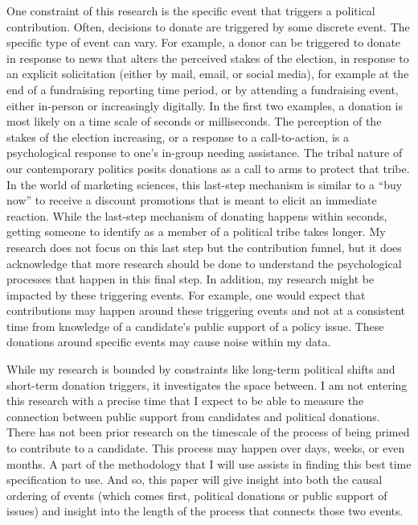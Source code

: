\documentclass[12pt,]{article}
\begin{document}
One constraint of this research is the specific event that triggers a
political contribution. Often, decisions to donate are triggered by some
discrete event. The specific type of event can vary. For example, a
donor can be triggered to donate in response to news that alters the
perceived stakes of the election, in response to an explicit
solicitation (either by mail, email, or social media), for example at
the end of a fundraising reporting time period, or by attending a
fundraising event, either in-person or increasingly digitally. In the
first two examples, a donation is most likely on a time scale of seconds
or milliseconds. The perception of the stakes of the election
increasing, or a response to a call-to-action, is a psychological
response to one's in-group needing assistance. The tribal nature of our
contemporary politics posits donations as a call to arms to protect that
tribe. In the world of marketing sciences, this last-step mechanism is
similar to a ``buy now'' to receive a discount promotions that is meant
to elicit an immediate reaction. While the last-step mechanism of
donating happens within seconds, getting someone to identify as a member
of a political tribe takes longer. My research does not focus on this
last step but the contribution funnel, but it does acknowledge that more
research should be done to understand the psychological processes that
happen in this final step. In addition, my research might be impacted by
these triggering events. For example, one would expect that
contributions may happen around these triggering events and not at a
consistent time from knowledge of a candidate's public support of a
policy issue. These donations around specific events may cause noise
within my data.

While my research is bounded by constraints like long-term political
shifts and short-term donation triggers, it investigates the space
between. I am not entering this research with a precise time that I
expect to be able to measure the connection between public support from
candidates and political donations. There has not been prior research on
the timescale of the process of being primed to contribute to a
candidate. This process may happen over days, weeks, or even months. A
part of the methodology that I will use assists in finding this best
time specification to use. And so, this paper will give insight into
both the causal ordering of events (which comes first, political
donations or public support of issues) and insight into the length of
the process that connects those two events.
\end{document}
